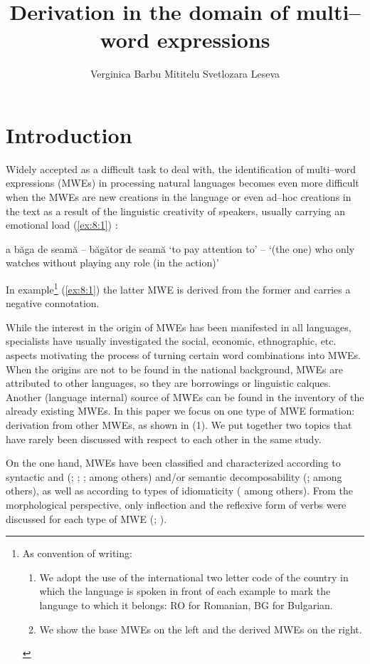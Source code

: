 \documentclass[output=paper]{langsci/langscibook}
\author{Verginica Barbu Mititelu\affiliation{Romanian Academy Research Institute for Artificial Intelligence}%
\lastand Svetlozara Leseva\affiliation{Institute for Bulgarian Language, Bulgarian Academy of Sciences}}
\title{Derivation in the domain of multi–word expressions}
\begin{document}
\section{Introduction}
\label{introduction}

Widely accepted as a difficult task to deal with, the identification of
multi–word expressions (MWEs) in processing natural languages becomes
even more difficult when the MWEs are new creations in the language or
even ad–hoc creations in the text as a result of the linguistic
creativity of speakers, usually carrying an emotional load  (\ref{ex:8:1}) :


\begin{exe}
\ex \label{ex:8:1}
\settowidth{}
a băga de seamă – băgător de seamă  
\glt ‘to pay attention to’ – ‘(the one) who only watches without playing any
role (in the action)’
\end{exe}


In example\footnote{
As convention of writing: 
\renewcommand{\theenumi}{(\roman{enumi})}%
\begin{enumerate}
\item  We adopt
the use of the international two letter code of the country in which the language is spoken in front
of each example to mark the language to which it belongs: RO for
Romanian, BG for Bulgarian. 
\item We show the base
MWEs on the left and the derived MWEs on the right.
\end{enumerate}
} (\ref{ex:8:1}) the latter MWE is derived from the
former and carries a negative connotation.

While the interest in the origin of MWEs has been manifested in all
languages, specialists have usually investigated the social, economic,
ethnographic, etc. aspects motivating the process of turning certain
word combinations into MWEs. When the origins are not to be found in
the national background, MWEs are attributed to other languages, so
they are borrowings or linguistic calques. Another (language internal)
source of MWEs can be found in the inventory of the already existing
MWEs. In this paper we focus on one type of MWE formation: derivation
from other MWEs, as shown in (1). We put together two topics that have
rarely been discussed with respect to each other in the same study.



On the one hand, MWEs have been classified and characterized according
to syntactic and  (\citealt{Nunberg1994}; \citealt{Sag:2002}; \citealt{baldwin2003}; \citealt{Baldwin2010} among others)
and/or semantic decomposability (\citealt{Nunberg1994}; \citealt{baldwin2003} among others), as well as according to types of idiomaticity
(\citealt{baldwin2004, baldwin2006} among others). From the morphological perspective,
only inflection and the reflexive form of verbs were discussed for each
type of MWE (\citealt{Sag:2002}; \citealt{Savary:2008}).
\end{document}
